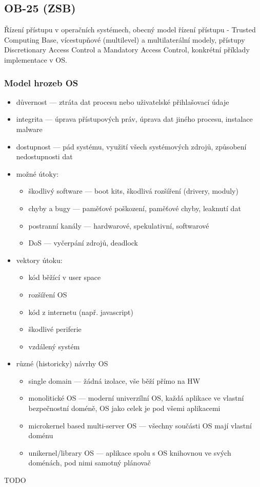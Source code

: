 \subsection{OB-25 (ZSB)}
Řízení přístupu v operačních systémech, obecný model řízení přístupu - Trusted Computing Base, vícestupňové (multilevel) a multilaterální modely, přístupy Discretionary Access Control a Mandatory Access Control, kon\-krét\-ní příklady implementace v OS.

\subsubsection*{Model hrozeb OS}
\begin{itemize}
	\item důvernost --- ztráta dat procesu nebo uživatelské přihlašovací údaje
	\item integrita --- úprava přístupových práv, úprava dat jiného procesu, instalace malware
	\item dostupnost --- pád systému, využití všech systémových zdrojů, způsobení nedostupnosti dat
	\item možné útoky:
	\begin{itemize}
		\item škodlivý software --- boot kits, škodlivá rozšíření (drivery, moduly)
		\item chyby a bugy --- paměťové poškození, paměťové chyby, leaknutí dat
		\item postranní kanály --- hardwarové, spekulativní, softwarové
		\item DoS --- vyčerpání zdrojů, deadlock
	\end{itemize}
	\item vektory útoku:
	\begin{itemize}
		\item kód běžící v user space
		\item rozšíření OS
		\item kód z internetu (např. javascript)
		\item škodlivé periferie
		\item vzdálený systém
	\end{itemize}
	\item různé (historicky) návrhy OS
	\begin{itemize}
		\item single domain --- žádná izolace, vše běží přímo na HW
		\item monolitické OS --- moderní univerzílní OS, každá aplikace ve vlastní bezpečnostní doméně, OS jako celek je pod všemi aplikacemi
		\item microkernel based multi-server OS --- všechny součásti OS mají vlastní doménu
		\item unikernel/library OS --- aplikace spolu s OS knihovnou ve svých doménách, pod nimi samotný plánovač
	\end{itemize}
\end{itemize}

TODO